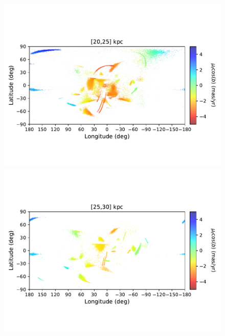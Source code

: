 \begin{figure}[h!]
\begin{center}
            \includegraphics[clip=true, trim = 0mm 20mm 0mm 20mm, width=\columnwidth]{images/PII_ensemble_LB_D20-25_PML_new.pdf}
            \includegraphics[clip=true, trim = 0mm 20mm 0mm 20mm, width=\columnwidth]{images/PII_ensemble_LB_D25-30_PML_new.pdf}


\end{center}
\end{figure}
